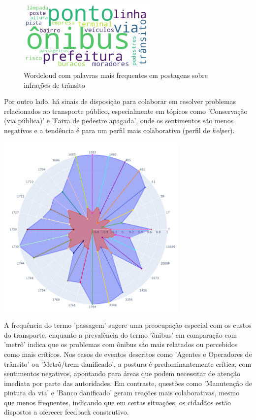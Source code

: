 \begin{figure}[htb]
	\centering
	\includegraphics[width=0.6\textwidth]{images/wordcloud_busfare.png}
	\caption{Wordcloud com palavras mais frequentes em postagens sobre infrações de trânsito}
	\label{fig:wordcloud_busfare}
\end{figure}

Por outro lado, há sinais de disposição para colaborar em resolver problemas relacionados ao transporte público, especialmente em tópicos como 'Conservação (via pública)' e 'Faixa de pedestre apagada', onde os sentimentos são menos negativos e a tendência é para um perfil mais colaborativo (perfil de \textit{helper}).

\begin{quadro}[htb]
	\centering
	\includegraphics[width=0.7\textwidth]{images/social_barometer_bus_fare.png}
	\caption{Gráfico de Radar ilustrando a pressão social em relação ao tópico de Tarifa de Transporte Público}
	\label{fig:social_barometer_bus_fare}
\end{quadro}

A frequência do termo 'passagem' sugere uma preocupação especial com os custos do transporte, enquanto a prevalência do termo 'ônibus' em comparação com 'metrô' indica que os problemas com ônibus são mais relatados ou percebidos como mais críticos. Nos casos de eventos descritos como 'Agentes e Operadores de trânsito' ou 'Metrô/trem danificado', a postura é predominantemente crítica, com sentimentos negativos, apontando para áreas que podem necessitar de atenção imediata por parte das autoridades. Em contraste, questões como 'Manutenção de pintura da via' e 'Banco danificado' geram reações mais colaborativas, mesmo que menos frequentes, indicando que em certas situações, os cidadãos estão dispostos a oferecer feedback construtivo.

